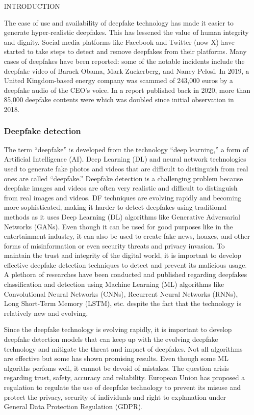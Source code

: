\begin{section}[]{\uppercase{Introduction}}
    \par
    The ease of use and availability of deepfake technology has made it easier to generate hyper-realistic deepfakes. This has lessened the value of human integrity and dignity. Social media platforms like Facebook and Twitter (now X) have started to take steps to detect and remove deepfakes from their platforms. 
    Many cases of deepfakes have been reported: some of the notable incidents include the deepfake video of Barack Obama, Mark Zuckerberg, and Nancy Pelosi. In 2019, a United Kingdom-based energy company was scammed of 243,000 euros by a deepfake audio of the CEO's voice. \cite{Damiani2019}
    In a report published back in 2020, more than 85,000 deepfake contents were which was doubled since initial observation in 2018. \cite{CyberNews2021}

    \subsubsection{Deepfake detection}
    The term “deepfake” is developed from the technology “deep learning,” a form of Artificial Intelligence (AI). Deep Learning (DL) and neural network technologies used to generate fake photos and
    videos that are difficult to distinguish from real ones are called “deepfake.” Deepfake detection is a challenging problem because deepfake images and videos are often very realistic and difficult to distinguish from real images and videos. 
    DF techniques are evolving rapidly and becoming more sophisticated, making it harder to detect deepfakes using traditional methods as it uses Deep Learning (DL) algorithms like Generative Adversarial Networks (GANs).
    Even though it can be used for good purposes like in the entertainment industry, it can also be used to create fake news, hoaxes, and other forms of misinformation or even security threats and privacy invasion.
    To maintain the trust and integrity of the digital world, it is important to develop effective deepfake detection techniques to detect and prevent its malicious usage. \cite{Korshunov2019}
    A plethora of researches have been conducted and published regarding deepfakes classification and detection using Machine Learning (ML) algorithms like Convolutional Neural Networks (CNNs), Recurrent Neural Networks (RNNs), Long Short-Term Memory (LSTM), etc. despite the fact that the technology is relatively new and evolving.

    \par Since the deepfake technology is evolving rapidly, it is important to develop deepfake detection models that can keep up with the evolving deepfake technology and mitigate the threat and impact of deepfakes. Not all algorithms are effective but some has shown promising results. Even though some ML algoriths perfoms well, it cannot be devoid of mistakes. The question arisis regarding trust, safety, accuracy and reliability. 
    European Union has proposed a regulation to regulate the use of deepfake technology to prevent its misuse and protect the privacy, security of individuals and right to explanation under General Data Protection Regulation (GDPR). \cite{Goodman2017}


\end{section}
